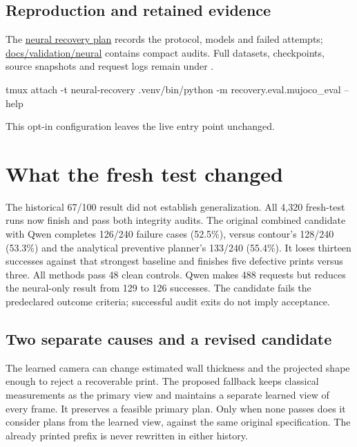 \documentclass[10pt,letterpaper]{article}
\newcommand{\repourl}{https://github.com/3D-Printing-Failure-Detection/failure-detection/blob/work/neural-local-recovery}
\newcommand{\repo}[2]{\href{\repourl/#1}{#2}}
\newcommand{\nextpage}{\clearpage}
\begin{document}
\subsection*{Reproduction and retained evidence}
The \repo{docs/neural-recovery-plan.md}{neural recovery plan} records the protocol,
models and failed attempts; \repo{docs/validation/neural}{docs/validation/neural}
contains compact audits. Full datasets, checkpoints, source snapshots and request
logs remain under .

\begin{Code}
tmux attach -t neural-recovery
.venv/bin/python -m recovery.eval.mujoco_eval --help
\end{Code}
This opt-in configuration leaves the live entry point unchanged.

\nextpage
\section{What the fresh test changed}

The historical 67/100 result did not establish generalization. All 4,320 fresh-test
runs now finish and pass both integrity audits. The original combined candidate
with Qwen completes 126/240 failure cases (52.5\%), versus contour's 128/240
(53.3\%) and the analytical preventive planner's 133/240 (55.4\%). It loses thirteen
successes against that strongest baseline and finishes five defective prints
versus three. All methods pass 48 clean controls. Qwen makes 488 requests but
reduces the neural-only result from 129 to 126 successes. The candidate fails the
predeclared outcome criteria; successful audit exits do not imply acceptance.

\subsection*{Two separate causes and a revised candidate}
The learned camera can change estimated wall thickness and the projected shape
enough to reject a recoverable print. The proposed fallback keeps classical
measurements as the primary view and maintains a separate learned view of every
frame. It preserves a feasible primary plan. Only when none passes does it
consider plans from the learned view, against the same original specification.
The already printed prefix is never rewritten in either history.
\end{document}
